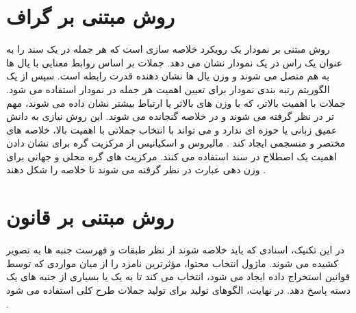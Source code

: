 \section{روش مبتنی بر گراف}
روش مبتنی بر نمودار یک رویکرد خلاصه سازی است که هر جمله در یک سند را به عنوان یک راس در یک نمودار نشان می دهد. جملات بر اساس روابط معنایی با یال ها به هم متصل می شوند و وزن یال ها نشان دهنده قدرت رابطه است. سپس از یک الگوریتم رتبه بندی نمودار برای تعیین اهمیت هر جمله در نمودار استفاده می شود. جملات با اهمیت بالاتر، که با وزن های بالاتر یا ارتباط بیشتر نشان داده می شوند، مهم تر در نظر گرفته می شوند و در خلاصه گنجانده می شوند. این روش نیازی به دانش عمیق زبانی یا حوزه ای ندارد و می تواند با انتخاب جملاتی با اهمیت بالا، خلاصه های مختصر و منسجمی ایجاد کند
\cite{andhale2016overview}.
مالیروس و اسکیانیس  از مرکزیت گره برای نشان دادن اهمیت یک اصطلاح در سند استفاده می کنند. مرکزیت های گره محلی و جهانی برای وزن دهی عبارت در نظر گرفته می شوند تا خلاصه را شکل دهند
\cite{GraphBased}.
\section{روش مبتنی بر قانون }
در این تکنیک، اسنادی که باید خلاصه شوند از نظر طبقات و فهرست جنبه ها به تصویر کشیده می شوند. ماژول انتخاب محتوا، مؤثرترین نامزد را از میان مواردی که توسط قوانین استخراج داده ایجاد می شود، انتخاب می کند تا به یک یا بسیاری از جنبه های یک دسته پاسخ دهد. در نهایت، الگوهای تولید برای تولید جملات طرح کلی استفاده می شود
\cite{Moratanchsurvey}.






